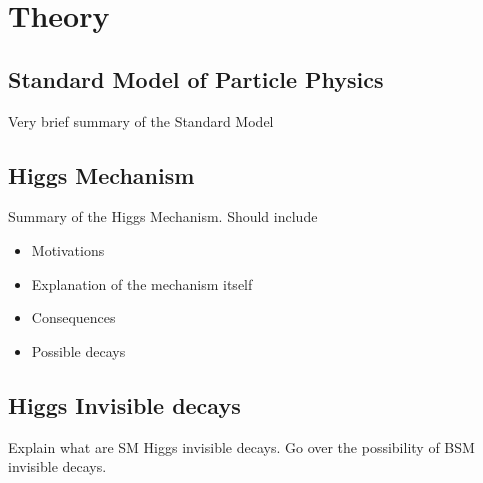 \chapter{Theory}

\section{Standard Model of Particle Physics}

Very brief summary of the Standard Model

\section{Higgs Mechanism}

Summary of the Higgs Mechanism. Should include
\begin{itemize}
 \item Motivations 
 \item Explanation of the mechanism itself
 \item Consequences 
 \item Possible decays
\end{itemize}

\section{Higgs Invisible decays}

Explain what are SM Higgs invisible decays. Go over the possibility of BSM invisible decays.

